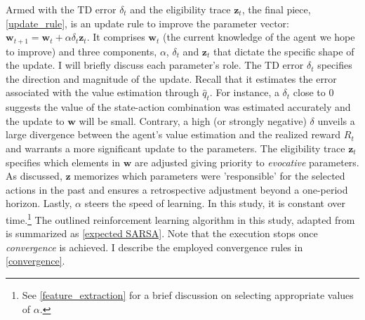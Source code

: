 Armed with the TD error $\delta_t$ and the eligibility trace $\boldsymbol{z}_t$, the final piece, \autoref{update_rule}, is an update rule to improve the parameter vector: $\boldsymbol{w}_{t+1} = \boldsymbol{w}_t + \alpha \delta_t	\boldsymbol{z}_t$. It comprises $\boldsymbol{w}_t$  (the current knowledge of the agent we hope to improve) and three components, $\alpha$, $\delta_t$ and $\boldsymbol{z}_t$ that dictate the specific shape of the update. I will briefly discuss each parameter's role. The TD error $\delta_t$ specifies the direction and magnitude of the update. Recall that it estimates the error associated with the value estimation through $\hat{q}_t$. For instance, a $\delta_t$ close to 0 suggests the value of the state-action combination was estimated accurately and the update to $\boldsymbol{w}$ will be small. Contrary, a high (or strongly negative) $\delta$ unveils a large divergence between the agent's value estimation and the realized reward $R_t$ and warrants a more significant update to the parameters. The eligibility trace $\boldsymbol{z}_t$ specifies which elements in $\boldsymbol{w}$ are adjusted giving priority to \emph{evocative} parameters. As discussed, $\boldsymbol{z}$ memorizes which parameters were 'responsible' for the selected actions in the past and ensures a retrospective adjustment beyond a one-period horizon. Lastly, $\alpha$ steers the speed of learning. In this study, it is constant over time.\footnote{See \autoref{feature_extraction} for a brief discussion on selecting appropriate values of $\alpha$.} The outlined reinforcement learning algorithm in this study, adapted from \textcite[p.287-312]{sutton_reinforcement_2018} is summarized as \autoref{expected SARSA}. Note that the execution stops once \emph{convergence} is achieved. I describe the employed convergence rules in \autoref{convergence}.

